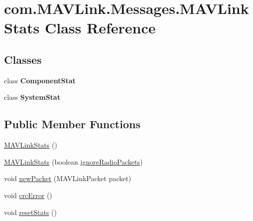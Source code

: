 \hypertarget{classcom_1_1MAVLink_1_1Messages_1_1MAVLinkStats}{}\section{com.\+M\+A\+V\+Link.\+Messages.\+M\+A\+V\+Link\+Stats Class Reference}
\label{classcom_1_1MAVLink_1_1Messages_1_1MAVLinkStats}
\subsection*{Classes}
\begin{DoxyCompactItemize}
\item 
class {\bfseries Component\+Stat}
\item 
class {\bfseries System\+Stat}
\end{DoxyCompactItemize}
\subsection*{Public Member Functions}
\begin{DoxyCompactItemize}
\item 
\mbox{\hyperlink{classcom_1_1MAVLink_1_1Messages_1_1MAVLinkStats_a3bce8a63c9eaacba068bd0bc559ec9ea}{M\+A\+V\+Link\+Stats}} ()
\item 
\mbox{\hyperlink{classcom_1_1MAVLink_1_1Messages_1_1MAVLinkStats_a53a7b219944fb2bf8d147a031a1af65e}{M\+A\+V\+Link\+Stats}} (boolean \mbox{\hyperlink{classcom_1_1MAVLink_1_1Messages_1_1MAVLinkStats_a1dde02cba4a77df273af88534f38e29a}{ignore\+Radio\+Packets}})
\item 
void \mbox{\hyperlink{classcom_1_1MAVLink_1_1Messages_1_1MAVLinkStats_aa1601a2fcc7ff51f2aa577272337bf8a}{new\+Packet}} (M\+A\+V\+Link\+Packet packet)
\item 
void \mbox{\hyperlink{classcom_1_1MAVLink_1_1Messages_1_1MAVLinkStats_a15deaa3b7c3753cc5a4cd11332f05182}{crc\+Error}} ()
\item 
void \mbox{\hyperlink{classcom_1_1MAVLink_1_1Messages_1_1MAVLinkStats_a265bed2364d06155083538d3d258ee46}{reset\+Stats}} ()
\end{DoxyCompactItemize}
